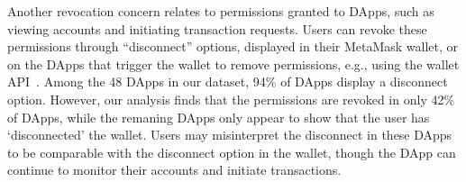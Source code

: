 \documentclass[conference]{IEEEtran}
\begin{document}
Another revocation concern relates to permissions granted to DApps, such as viewing accounts and initiating transaction requests. 
Users can revoke these permissions through ``disconnect'' options, displayed in their MetaMask wallet, or on the DApps that trigger the wallet to remove permissions, e.g., using the wallet API~\cite{metamaskRevokePermissions}.
Among the 48 DApps in our dataset, 94\% of DApps display a disconnect option.
However, our analysis finds that the permissions are revoked in only 42\% of DApps, while the remaning DApps only appear to show that the user has `disconnected' the wallet.
Users may misinterpret the disconnect in these DApps to be comparable with the disconnect option in the wallet, though the DApp can continue to monitor their accounts and initiate transactions. 


\end{document}
